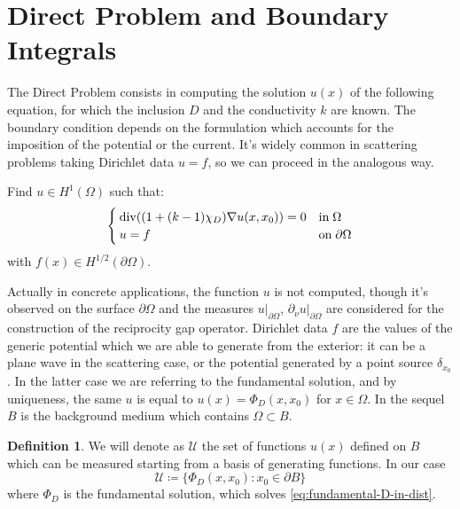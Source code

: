 \documentclass[10pt, a4paper, twoside, openright]{book}
\theoremstyle{definition}
\newtheorem{definition}[subsection]{Definition}
\theoremstyle{plain}
\theoremstyle{plain}
\theoremstyle{plain}
\theoremstyle{plain}
\theoremstyle{plain}
\theoremstyle{plain}
\theoremstyle{plain}
\theoremstyle{plain}
\DeclareMathOperator{\divergence}{div}
\begin{document}
\section{Direct Problem and Boundary Integrals}
The Direct Problem consists in computing the solution $u(x)$ of the following equation, for which the inclusion $D$ and the conductivity $k$ are known. The boundary condition depends on the formulation which accounts for the imposition of the potential or the current. It's widely common in scattering problems taking Dirichlet data $u=f$, so we can proceed in the analogous way.
\begin{center}
\colorbox{light-gray}{\color{black}\parbox{\textwidth}{
Find $u \in H^1(\Omega)$ such that:
\begin{equation}
  \begin{cases}
  \divergence((1+(k-1)\chi_D)\nabla u(x,x_0)) = 0 & \textup{in}\;\Omega\\
  u = f & \textup{on}\;\partial\Omega
 \end{cases}
\end{equation}
with $f(x) \in H^{1/2}(\partial\Omega)$.
}}
\end{center}
Actually in concrete applications, the function $u$ is not computed, though it's observed on the surface $\partial\Omega$ and the measures $u|_{\partial \Omega}$, $\partial_\nu u|_{\partial \Omega}$ are considered for the construction of the reciprocity gap operator. Dirichlet data $f$ are the values of the generic potential which we are able to generate from the exterior: it can be a plane wave in the scattering case, or the potential generated by a point source $\delta_{x_0}$. In the latter case we are referring to the fundamental solution, and by uniqueness, the same $u$ is equal to $u(x)=\Phi_D(x,x_0)$ for $x\in \Omega$.
In the sequel $B$ is the background medium which contains $\Omega\subset B$.
\begin{definition}
\label{def:setU}
We will denote as $\mathcal{U}$ the set of functions $u(x)$ defined on $B$ which can be measured starting from a basis of generating functions.
In our case
\begin{equation}
 \mathcal{U}\coloneqq\bigl\{\Phi_D(x, x_0): x_0\in \partial B\bigr\}
\end{equation}
where $\Phi_D$ is the fundamental solution, which solves \eqref{eq:fundamental-D-in-dist}.
\end{definition}
\end{document}
